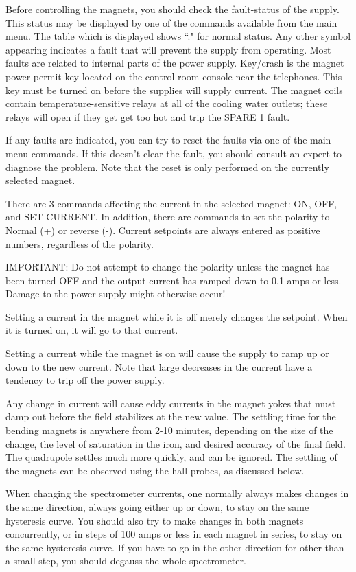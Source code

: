 Before controlling the magnets, you should check the fault-status of the supply.
This status may be displayed by one of the commands available from the main
menu. The table which is displayed shows ``." for normal status. Any other symbol
appearing indicates a fault that will prevent the supply from operating. Most
faults are related to internal parts of the power supply. Key/crash is the
magnet power-permit key located on the control-room console near the telephones.
This key must be turned on before the supplies will supply current. The magnet
coils contain temperature-sensitive relays at all of the cooling water outlets;
these relays will open if they get get too hot and trip the SPARE 1 fault.

If any faults are indicated, you can try to reset the faults via one of the
main-menu commands. If this doesn't clear the fault, you should consult an
expert to diagnose the problem. Note that the reset is only performed on the
currently selected magnet.

There are 3 commands affecting the current in the selected magnet: ON, OFF,
and SET CURRENT. In addition, there are commands to set the polarity to
Normal (+) or reverse (-). Current setpoints are always entered as positive
numbers, regardless of the polarity.

IMPORTANT: Do not attempt to change the polarity unless the magnet has been
turned OFF and the output current has ramped down to 0.1 amps or less. Damage
to the power supply might otherwise occur!

Setting a current in the magnet while it is off merely changes the setpoint.
When it is turned on, it will go to that current.

Setting a current while the magnet is on will cause the supply to ramp up or
down to the new current. Note that large decreases in the current have a
tendency to trip off the power supply.

Any change in current will cause eddy currents in the magnet yokes that must
damp out before the field stabilizes at the new value. The settling time for the
bending magnets is anywhere from 2-10 minutes, depending on the size of the
change, the level of saturation in the iron, and desired accuracy of the final
field. The quadrupole settles much more quickly, and can be ignored. The
settling of the magnets can be observed using the hall probes, as discussed
below.

When changing the spectrometer currents, one normally always makes changes in
the same direction, always going either up or down, to stay on the same
hysteresis curve. You should also try to make changes in both magnets
concurrently, or in steps of 100 amps or less in each magnet in series, to stay
on the same hysteresis curve. If you have to go in the other direction for other
than a small step, you should degauss the whole spectrometer.

